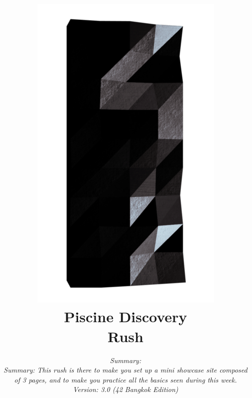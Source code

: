 \documentclass[12pt, a4paper]{report}
\renewcommand{\thechapter}{\Roman{chapter}}
\begin{document}
\begin{titlepage}
	\centering
	\title{%
		\vspace{-6cm}
		\includegraphics[scale=1.8]{Logo_42.png} \\
		\vspace{1cm}
		\huge Piscine Discovery\\
		\vspace{.6cm}
		\LARGE Rush
		}

	\date{%
		\vspace{2.2cm}
		\it\normalsize Summary: \\
		Summary: This rush is there to make you set up a mini showcase site composed of 3 pages, and to make you practice all the basics seen during this week. \\
		\vspace{.8cm}
		Version: 3.0 (42 Bangkok Edition)
		}
	\maketitle


	\end{titlepage}
\end{document}
